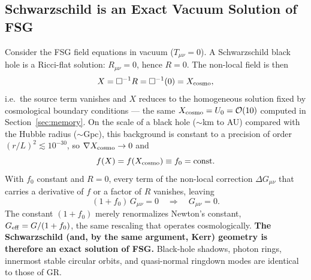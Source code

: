 \documentclass[11pt,a4paper]{article}
\begin{document}
\begin{onehalfspacing}
\subsection{Schwarzschild is an Exact Vacuum Solution of FSG}
Consider the FSG field equations in vacuum ($T_{\mu\nu}=0$). A Schwarzschild black hole is a Ricci-flat solution: $R_{\mu\nu}=0$, hence $R=0$. The non-local field is then
\begin{equation}
X = \Box^{-1}R = \Box^{-1}(0) = X_{\rm cosmo},
\end{equation}
i.e.\ the source term vanishes and $X$ reduces to the homogeneous solution fixed by cosmological boundary conditions --- the same $X_{\rm cosmo}=U_0=\mathcal{O}(10)$ computed in Section~\ref{sec:memory}. On the scale of a black hole ($\sim$km to AU) compared with the Hubble radius ($\sim$Gpc), this background is constant to a precision of order $(r/L)^2 \lesssim 10^{-30}$, so $\nabla X_{\rm cosmo}\to 0$ and
\begin{equation}
f(X) = f(X_{\rm cosmo}) \equiv f_0 = \text{const.}
\end{equation}
With $f_0$ constant and $R=0$, every term of the non-local correction $\Delta G_{\mu\nu}$ that carries a derivative of $f$ or a factor of $R$ vanishes, leaving
\begin{equation}
(1+f_0)\,G_{\mu\nu} = 0 \quad\Longrightarrow\quad G_{\mu\nu}=0.
\end{equation}
The constant $(1+f_0)$ merely renormalizes Newton's constant, $G_{\rm eff}=G/(1+f_0)$, the same rescaling that operates cosmologically. \textbf{The Schwarzschild (and, by the same argument, Kerr) geometry is therefore an exact solution of FSG.} Black-hole shadows, photon rings, innermost stable circular orbits, and quasi-normal ringdown modes are identical to those of GR.

\end{onehalfspacing}
\end{document}
